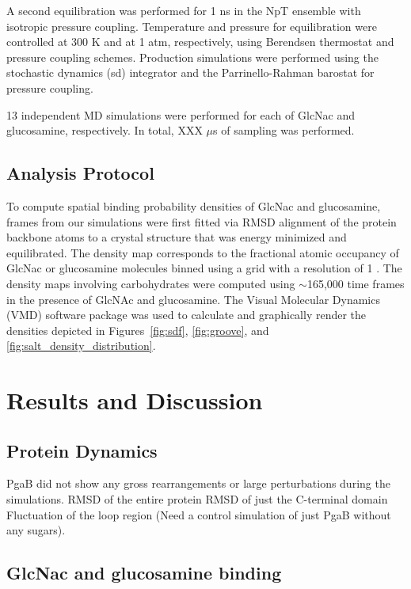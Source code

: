 A second equilibration was performed for 1 ns in the NpT ensemble with isotropic pressure coupling. Temperature and pressure for equilibration were controlled at 300 K and at 1 atm, respectively, using Berendsen thermostat and pressure coupling schemes. Production simulations were performed using the stochastic dynamics (sd) integrator and the Parrinello-Rahman barostat for pressure coupling.

13 independent MD simulations were performed for each of GlcNac and glucosamine, respectively. In total, XXX $\mu$s of sampling was performed.

\subsection*{Analysis Protocol}
To compute spatial binding probability densities of GlcNac and glucosamine, frames from our simulations were first fitted via RMSD alignment of the protein backbone atoms to a crystal structure that was energy minimized and equilibrated. The density map corresponds to the fractional atomic occupancy of GlcNac or glucosamine molecules binned using a grid with a resolution of 1 \angstrom.  The density maps involving carbohydrates were computed using $\sim$165,000 time frames in the presence of GlcNAc and glucosamine. The Visual Molecular Dynamics (VMD) software package\cite{Humphrey:1996to} was used to calculate and graphically render the densities depicted in Figures~\ref{fig:sdf}, \ref{fig:groove}, and \ref{fig:salt_density_distribution}.

\section{Results and Discussion}

\subsection{Protein Dynamics}
PgaB did not show any gross rearrangements or large perturbations during the simulations.
RMSD of the entire protein
RMSD of just the C-terminal domain
Fluctuation of the loop region (Need a control simulation of just PgaB without any sugars).

\subsection{GlcNac and glucosamine binding}

